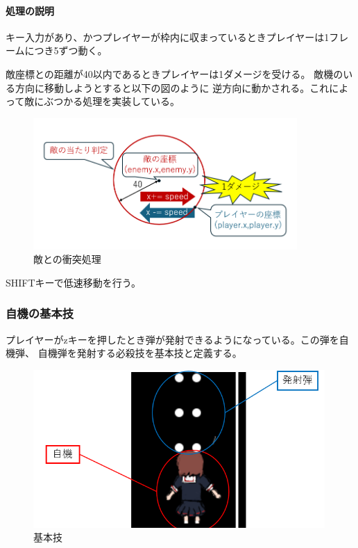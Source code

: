 \documentclass[a4paper,titlepage,11pt]{ltjsarticle}
\begin{document}
\paragraph{処理の説明}

キー入力があり、かつプレイヤーが枠内に収まっているときプレイヤーは1フレームにつき5ずつ動く。

敵座標との距離が40以内であるときプレイヤーは1ダメージを受ける。
敵機のいる方向に移動しようとすると以下の図のように
逆方向に動かされる。これによって敵にぶつかる処理を実装している。
\begin{figure}[H]
	\begin{center}
		\includegraphics*[height = 5cm]{enemy_reject.png}
		\caption{敵との衝突処理}
	\end{center}
\end{figure}

SHIFTキーで低速移動を行う。
\subsubsection{自機の基本技}
プレイヤーがzキーを押したとき弾が発射できるようになっている。この弾を自機弾、
自機弾を発射する必殺技を基本技と定義する。
\begin{figure}[H]
\begin{center}
\includegraphics*[height = 6cm]{basic_avility.png}
\caption{基本技}
\end{center}
\end{figure}
\end{document}
